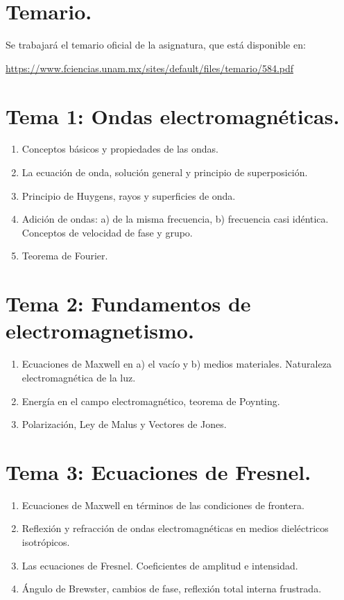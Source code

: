 \section*{Temario.}

Se trabajará el temario oficial de la asignatura, que está disponible en:

\href{https://www.fciencias.unam.mx/sites/default/files/temario/584.pdf}{https://www.fciencias.unam.mx/sites/default/files/temario/584.pdf}

\section{Tema 1: Ondas electromagnéticas.}
\begin{enumerate}
\item Conceptos básicos y propiedades de las ondas.
\item La ecuación de onda, solución general y principio de superposición.
\item Principio de Huygens, rayos y superficies de onda.
\item Adición de ondas: a) de la misma frecuencia, b) frecuencia casi idéntica. Conceptos de velocidad de fase y grupo.
\item Teorema de Fourier.
\end{enumerate}

\section{Tema 2: Fundamentos de electromagnetismo.}
\begin{enumerate}
\item Ecuaciones de Maxwell en a) el vacío y b) medios materiales. Naturaleza electromagnética de
la luz.
\item Energía en el campo electromagnético, teorema de Poynting.
\item Polarización, Ley de Malus y Vectores de Jones.
\end{enumerate}

\section{Tema 3: Ecuaciones de Fresnel.}
\begin{enumerate}
\item Ecuaciones de Maxwell en términos de las condiciones de frontera.
\item Reflexión y refracción de ondas electromagnéticas en medios dieléctricos isotrópicos.
\item Las ecuaciones de Fresnel. Coeficientes de amplitud e intensidad.
\item Ángulo de Brewster, cambios de fase, reflexión total interna frustrada.
\end{enumerate}

